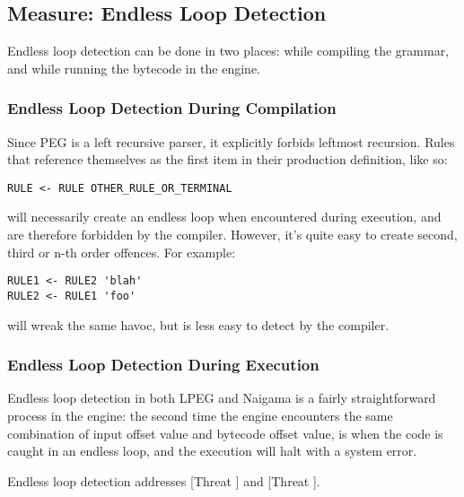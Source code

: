 \subsection{Measure: Endless Loop Detection}

Endless loop detection can be done in two places: while compiling the
grammar, and while running the bytecode in the engine.

\subsubsection{Endless Loop Detection During Compilation}

Since PEG is a left recursive parser, it explicitly forbids
leftmost recursion. Rules that reference themselves as the first item
in their production definition, like so:

\begin{myquote}
\begin{verbatim}
RULE <- RULE OTHER_RULE_OR_TERMINAL

\end{verbatim}
\end{myquote}

will necessarily create an endless loop when encountered during execution,
and are therefore forbidden by the compiler. However, it's quite easy to
create second, third or n-th order offences. For example:

\begin{myquote}
\begin{verbatim}
RULE1 <- RULE2 'blah'
RULE2 <- RULE1 'foo'

\end{verbatim}
\end{myquote}

will wreak the same havoc, but is less easy to detect by the compiler.

\subsubsection{Endless Loop Detection During Execution}

Endless loop detection in both LPEG and Naigama is a fairly straightforward
process in the engine: the second time the engine encounters the same
combination of input offset value and bytecode offset value, is when the
code is caught in an endless loop, and the execution will halt with a
system error.

Endless loop detection addresses [Threat \thethreatbcexec] and
[Threat \thethreatbcerror].
